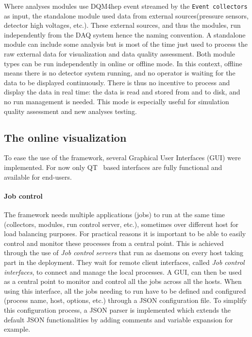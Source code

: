 \documentclass{webofc}
\begin{document}
Where analyses modules use DQM4hep event streamed by the \texttt{Event collectors} as input, the standalone module 
used data from external sources(pressure sensors, detector high voltages, etc.).
These external sources, and thus the modules, run independently from the DAQ system hence the naming convention. 
A standalone module can include some analysis but is most of the time just used to process the raw external data for visualization and data quality assessment. 
Both module types can be run independently in online or offline mode. In this context, offline means there is no detector system running, and no operator is waiting for the data to be displayed continuously. There is thus no incentive to process and display the data in real time: the data is read and stored from and to disk, and no run management is needed. This mode is especially useful for simulation quality assessment and new analyses testing. 

\subsection{The online visualization}
\label{subsec:vis}

To ease the use of the framework, several Graphical User Interfaces (GUI) were implemented. For now only QT~\cite{QT} based interfaces are fully functional and available for end-users. 

\paragraph{Job control}\label{par:JobControl}

The framework needs multiple applications (jobs) to run at the same time (collectors, modules, run control server, etc.), sometimes over different host for load balancing purposes.
For practical reasons it is important to be able to easily control and monitor these processes from a central point.
This is achieved through the use of \textit{Job control servers} that run as daemons on every host taking part in the deployment.
They wait for remote client interfaces, called \textit{Job control interfaces}, to connect and manage the local processes.
A GUI, can then be used as a central point to monitor and control all the jobs across all the hosts.
When using this interface, all the jobs needing to run have to be defined and configured (process name, host, options, etc.) through a JSON configuration file. To simplify this configuration process, a JSON parser is implemented which extends the default JSON functionalities by adding comments and variable expansion for example.
\end{document}
